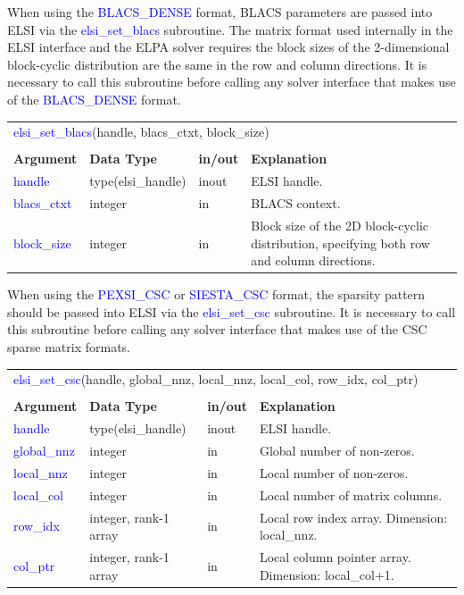 \documentclass{report}
\newcommand{\tcb}[1]{\textcolor{blue}{#1}}
\begin{document}
When using the \tcb{BLACS\_DENSE} format, BLACS parameters are passed into ELSI via the \tcb{elsi\_set\_blacs} subroutine. The matrix format used internally in the ELSI interface and the ELPA solver requires the block sizes of the 2-dimensional block-cyclic distribution are the same in the row and column directions. It is necessary to call this subroutine before calling any solver interface that makes use of the \tcb{BLACS\_DENSE} format.

\begin{tabular}[]{|p{30mm}|p{30mm}|p{15mm}|p{90mm}|}
\multicolumn{4}{l}{\tcb{elsi\_set\_blacs}(handle, blacs\_ctxt, block\_size)}\\
\multicolumn{4}{l}{}\\
\hline
\multicolumn{1}{|l|}{\textbf{Argument}} & \multicolumn{1}{l|}{\textbf{Data Type}} & \multicolumn{1}{l|}{\textbf{in/out}} & \multicolumn{1}{l|}{\textbf{Explanation}}\\
\hline
\tcb{handle}      & type(elsi\_handle) & inout & ELSI handle.\\
\hline
\tcb{blacs\_ctxt} & integer            & in    & BLACS context.\\
\hline
\tcb{block\_size} & integer            & in    & Block size of the 2D block-cyclic distribution, specifying both row and column directions.\\
\hline
\end{tabular}

When using the \tcb{PEXSI\_CSC} or \tcb{SIESTA\_CSC} format, the sparsity pattern should be passed into ELSI via the \tcb{elsi\_set\_csc} subroutine. It is necessary to call this subroutine before calling any solver interface that makes use of the CSC sparse matrix formats.

\begin{tabular}[]{|p{30mm}|p{35mm}|p{15mm}|p{85mm}|}
\multicolumn{4}{l}{\tcb{elsi\_set\_csc}(handle, global\_nnz, local\_nnz, local\_col, row\_idx, col\_ptr)}\\
\multicolumn{4}{l}{}\\
\hline
\multicolumn{1}{|l|}{\textbf{Argument}} & \multicolumn{1}{l|}{\textbf{Data Type}} & \multicolumn{1}{l|}{\textbf{in/out}} & \multicolumn{1}{l|}{\textbf{Explanation}}\\
\hline
\tcb{handle}      & type(elsi\_handle)    & inout & ELSI handle.\\
\hline
\tcb{global\_nnz} & integer               & in    & Global number of non-zeros.\\
\hline
\tcb{local\_nnz}  & integer               & in    & Local number of non-zeros.\\
\hline
\tcb{local\_col}  & integer               & in    & Local number of matrix columns.\\
\hline
\tcb{row\_idx}    & integer, rank-1 array & in    & Local row index array. Dimension: local\_nnz.\\
\hline
\tcb{col\_ptr}    & integer, rank-1 array & in    & Local column pointer array. Dimension: local\_col+1.\\
\hline
\end{tabular}
\end{document}
